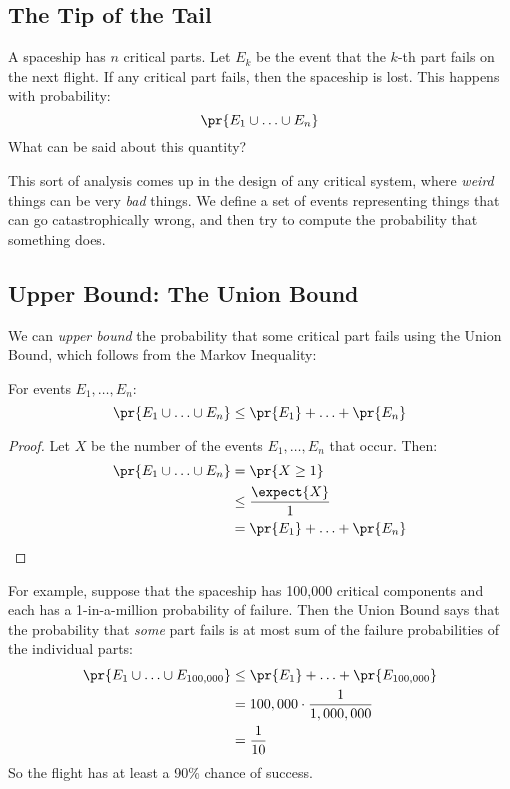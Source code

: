 \begin{editingnotes}

\section{The Tip of the Tail}

A spaceship has $n$ critical parts.  Let $E_k$ be the event that the
$k$-th part fails on the next flight.  If any critical part fails,
then the spaceship is lost.  This happens with probability:
%
\[
\pr{E_1 \cup \ldots \cup E_n}
\]
%
What can be said about this quantity?

This sort of analysis comes up in the design of any critical system,
where \textit{weird} things can be very \textit{bad} things.  We
define a set of events representing things that can go
catastrophically wrong, and then try to compute the probability that
something does.


\subsection{Upper Bound:  The Union Bound}

We can \textit{upper bound} the probability that some critical part
fails using the Union Bound, which follows from the Markov Inequality:

\begin{theorem}
\label{th:union-bound}
For events $E_1, \ldots, E_n$:
%
\[
\pr{E_1 \cup \ldots \cup E_n} \leq \pr{E_1} + \ldots + \pr{E_n}
\]
\end{theorem}

\begin{proof}
Let $X$ be the number of the events $E_1, \ldots, E_n$ that occur.
Then:
%
\begin{align*}
\pr{E_1 \cup \ldots \cup E_n}
    & = \pr{X \geq 1} \\
    & \leq \frac{\expect{X}}{1} \\
    & = \pr{E_1} + \ldots + \pr{E_n}
\end{align*}
\end{proof}

For example, suppose that the spaceship has 100,000 critical
components and each has a 1-in-a-million probability of failure.  Then
the Union Bound says that the probability that \textit{some} part
fails is at most sum of the failure probabilities of the individual
parts:
%
\begin{align*}
\pr{E_1 \cup \ldots \cup E_{100,000}}
    & \leq \pr{E_1} + \ldots + \pr{E_{100,000}} \\
    & = 100,000 \cdot \frac{1}{1,000,000} \\
    & = \frac{1}{10}
\end{align*}
%
So the flight has at least a 90\% chance of success.


\end{editingnotes}
